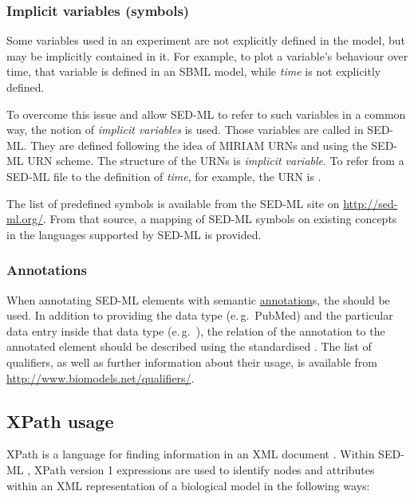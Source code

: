 \subsubsection{Implicit variables (symbols)}
\label{sec:implicitVariable}

Some variables used in an experiment are not explicitly defined in the model, but may be implicitly contained in it. For example, to plot a variable's behaviour over time, that variable is defined in an SBML model, while \emph{time} is not explicitly defined. 

To overcome this issue and allow SED-ML to refer to such variables in a common way, the notion of \emph{implicit variables} is used. Those variables are called  in SED-ML. They are defined following the idea of MIRIAM URNs and using the SED-ML URN scheme. The structure of the URNs is \emph{implicit variable}. To refer from a SED-ML file to the definition of \emph{time}, for example, the URN is .

The list of predefined symbols is available from the SED-ML site on \url{http://sed-ml.org/}.
From that source, a mapping of SED-ML symbols on existing concepts in the languages supported by SED-ML is provided.

\subsubsection{Annotations}
\label{sec:annotations}
When annotating SED-ML elements with semantic \hyperref[class:annotation]{annotation}s, the  should be used. In addition to providing the data type (e.\,g.\ PubMed) and the particular data entry inside that data type (e.\,g.\ ), the relation of the annotation to the annotated element should be described using the standardised . The list of qualifiers, as well as further information about their usage, is available from \url{http://www.biomodels.net/qualifiers/}.


\subsection{XPath usage}  
\label{sec:xpath}
XPath is a language for finding information in an XML document \citep{xpath:1999}. Within SED-ML \currentLV, XPath version 1 expressions are used to identify nodes and attributes within an XML representation of a biological model in the following ways:

